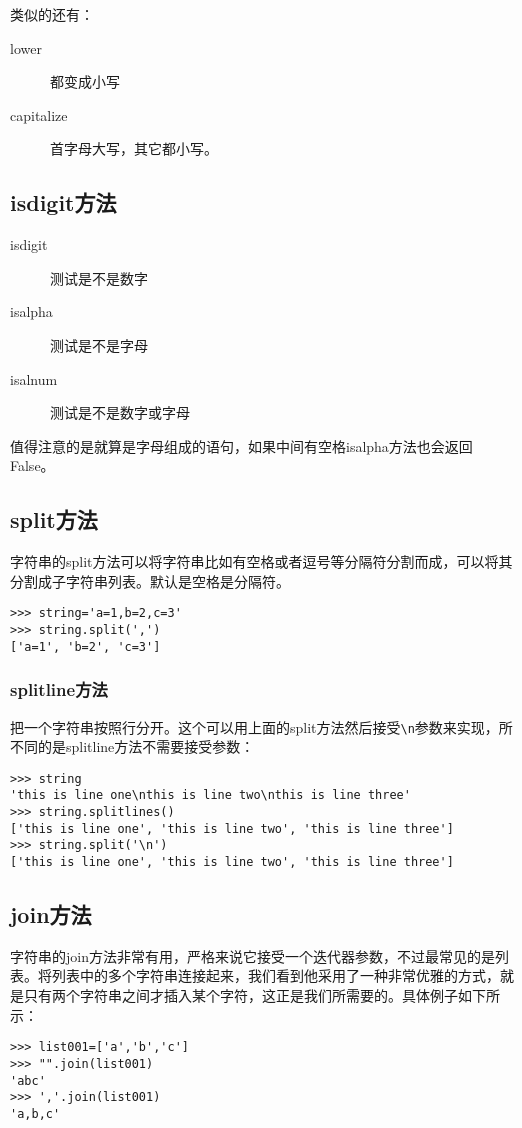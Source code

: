 \documentclass[12pt,oneside]{book}
\begin{document}
\begin{common-format}
类似的还有：
\begin{description}
\item[lower] 都变成小写
\item[capitalize] 首字母大写，其它都小写。
\end{description}



\subsection{isdigit方法}
\begin{description}
\item[isdigit] 测试是不是数字
\item[isalpha] 测试是不是字母
\item[isalnum] 测试是不是数字或字母
\end{description}

值得注意的是就算是字母组成的语句，如果中间有空格isalpha方法也会返回False。

\subsection{split方法}
字符串的split方法可以将字符串比如有空格或者逗号等分隔符分割而成，可以将其分割成子字符串列表。默认是空格是分隔符。
\begin{Verbatim}
>>> string='a=1,b=2,c=3'
>>> string.split(',')
['a=1', 'b=2', 'c=3']
\end{Verbatim}

\subsubsection{splitline方法}
把一个字符串按照行分开。这个可以用上面的split方法然后接受\verb+\n+参数来实现，所不同的是splitline方法不需要接受参数：
\begin{Verbatim}
>>> string
'this is line one\nthis is line two\nthis is line three'
>>> string.splitlines()
['this is line one', 'this is line two', 'this is line three']
>>> string.split('\n')
['this is line one', 'this is line two', 'this is line three']
\end{Verbatim}




\subsection{join方法}
字符串的join方法非常有用，严格来说它接受一个迭代器参数，不过最常见的是列表。将列表中的多个字符串连接起来，我们看到他采用了一种非常优雅的方式，就是只有两个字符串之间才插入某个字符，这正是我们所需要的。具体例子如下所示：
\begin{Verbatim}
>>> list001=['a','b','c']
>>> "".join(list001)
'abc'
>>> ','.join(list001)
'a,b,c'
\end{Verbatim}



\end{common-format}
\end{document}
